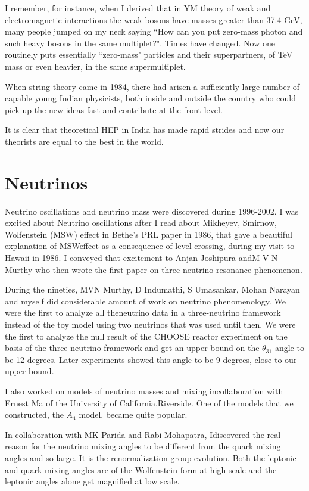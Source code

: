I remember, for instance, when I derived that in YM theory of weak and 
electromagnetic interactions the weak bosons have masses greater than 
37.4 GeV, many people jumped on my neck saying ``How can you put 
zero-mass photon and such heavy bosons in the same multiplet?". Times 
have changed. Now one routinely puts essentially ``zero-mass" particles 
and their superpartners, of TeV mass or even heavier, in the same 
supermultiplet.

When string theory came in 1984, there had arisen a suffici\-ently large 
number of capable young Indian physicists, both inside and outside the 
country who could pick up the new ideas fast and contribute at the front 
level.

It is clear that theoretical HEP in India has made rapid strides and now 
our theorists are equal to the best in the world.

\vspace{-\topsep}
\section*{Neutrinos}

Neutrino oscillations and neutrino mass were discovered during 
1996-2002. I was excited about Neutrino oscillations after I read about 
Mikheyev, Smirnow, Wolfenstein (MSW) effect in Bethe's PRL paper in 1986, 
that gave a beautiful explanation of MSW\break effect as a consequence of 
level crossing, during my visit to Hawaii in 1986. I conveyed that 
excitement to Anjan Joshipura and\break M V N Murthy who then wrote the first 
paper on three neutrino resonance phenomenon.

During the nineties,  MVN Murthy, D Indumathi, S Umasankar, 
Mohan Narayan and myself did considerable amount of work on neutrino 
phenomenology. We were the first to analyze all the\break neutrino data in a 
three-neutrino framework instead of the toy model using two neutrinos 
that was used until then. We were the first to analyze the null result 
of the CHOOSE reactor experi\-ment on the basis of the three-neutrino 
framework and get an upper bound on the $\theta_{31}$ angle to be 12 degrees. 
Later experiments showed this angle to be 9 degrees, close to our upper 
bound.

I also worked on models of neutrino masses and mixing in\break collaboration 
with Ernest Ma of the University of California,\break Riverside. One of the 
models that we constructed, the $A_4$ model, became quite popular.

In collaboration with MK Parida and Rabi Mohapatra, I\break discovered the 
real reason for the neutrino mixing angles to be different from the 
quark mixing angles and so large. It is the renormalization group 
evolution. Both the leptonic and quark mixing angles are of the 
Wolfenstein form at high scale and the leptonic angles alone get 
magnified at low scale.

